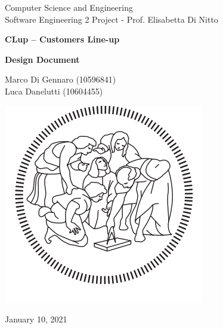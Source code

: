 \documentclass[10pt,openany]{book}
\begin{document}
\begin{titlepage}
    \clearpage
    \thispagestyle{empty}
	\centering
	\vspace{2cm}

	{\normalsize  Computer Science and Engineering\\Software Engineering 2 Project - Prof. Elisabetta Di Nitto\par}
	\vspace{3cm}
	{\Huge \textbf{CLup – Customers Line-up}} \\
	\vspace{1cm}
	{\large \textbf{Design Document} \par}
	\vspace{4cm}
	{\normalsize Marco Di Gennaro (10596841)\\Luca Danelutti (10604455)  \par}
	\vspace{2cm}

    \includegraphics[scale=0.4]{images/Logo_Politecnico_Milano.png}
    
    \vspace{2cm}

	{\normalsize January 10, 2021 \par}
	
	\pagebreak

\end{titlepage}

\tableofcontents{}

\clearpage

\mainmatter
\end{document}
